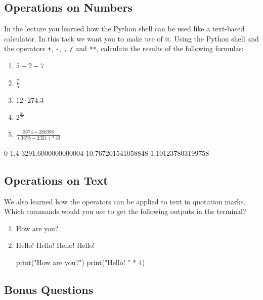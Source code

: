\subsection{Operations on Numbers}

In the lecture you learned how the Python shell can be used like a text-based calculator. In this task we want you to make use of it. Using the Python shell and the operators \texttt+, \texttt-, \texttt*, \texttt/ and \texttt{**}, calculate the results of the following formulas:

\begin{enumerate}

\item $5 + 2 - 7$
\item $\frac{7}{5}$
\item $12 \cdot 274.3$
\item $2^{\frac{24}{7}}$
\item $\frac{3674 + 280398}{(3678 + 2321) * 43}$

\end{enumerate}

\begin{solution}
    \begin{outputcode}
0
1.4
3291.6000000000004
10.767201541058848
1.101237803199758
    \end{outputcode}
\end{solution}

\subsection{Operations on Text}

We also learned how the operators can be applied to text in quotation marks.
Which commands would you use to get the following outputs in the terminal?

\begin{enumerate}

\item How are you?
\item Hello! Hello! Hello! Hello!

\begin{solution}
    \begin{pythoncode}
print("How are you?")
print("Hello! " * 4)
    \end{pythoncode}
\end{solution}

\end{enumerate}

\subsection{Bonus Questions}


